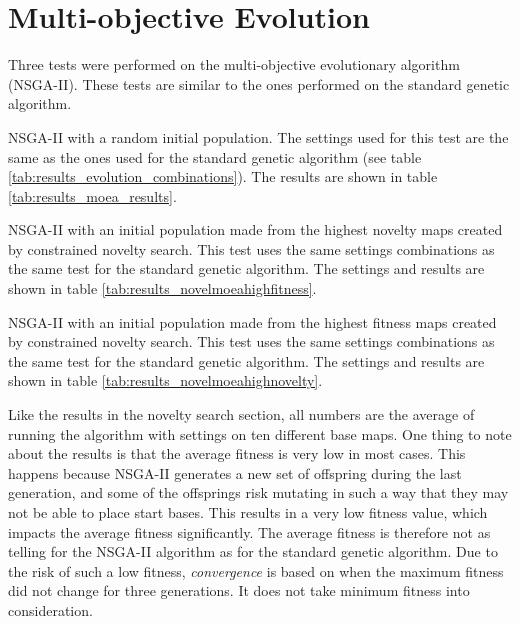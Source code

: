 \section{Multi-objective Evolution}
\label{results_moea}

Three tests were performed on the multi-objective evolutionary algorithm (NSGA-II). These tests are similar to the ones performed on the standard genetic algorithm.

\begin{my_itemize}

	\item NSGA-II with a random initial population. The settings used for this test are the same as the ones used for the standard genetic algorithm (see table \ref{tab:results_evolution_combinations}). The results are shown in table \ref{tab:results_moea_results}.

	\item NSGA-II with an initial population made from the highest novelty maps created by constrained novelty search. This test uses the same settings combinations as the same test for the standard genetic algorithm. The settings and results are shown in table \ref{tab:results_novelmoeahighfitness}.

	\item NSGA-II with an initial population made from the highest fitness maps created by constrained novelty search. This test uses the same settings combinations as the same test for the standard genetic algorithm. The settings and results are shown in table \ref{tab:results_novelmoeahighnovelty}.

\end{my_itemize}

Like the results in the novelty search section, all numbers are the average of running the algorithm with settings on ten different base maps. One thing to note about the results is that the average fitness is very low in most cases. This happens because NSGA-II generates a new set of offspring during the last generation, and some of the offsprings risk mutating in such a way that they may not be able to place start bases. This results in a very low fitness value, which impacts the average fitness significantly. The average fitness is therefore not as telling for the NSGA-II algorithm as for the standard genetic algorithm. Due to the risk of such a low fitness, \textit{convergence} is based on when the maximum fitness did not change for three generations. It does not take minimum fitness into consideration.

